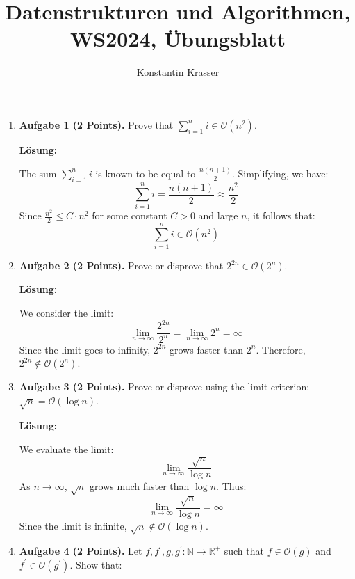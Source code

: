 \documentclass[11pt]{article}
\begin{document}
\author{Konstantin Krasser}
\title{Datenstrukturen und Algorithmen, WS2024, Übungsblatt}
\maketitle

\medskip

\begin{enumerate}

	\item
	      \textbf{Aufgabe 1 (2 Points).} Prove that \(\sum_{i=1}^n i \in \mathcal{O}\left(n^2\right)\).

	      \textbf{Lösung:}

	      The sum \(\sum_{i=1}^n i\) is known to be equal to \(\frac{n(n+1)}{2}\). Simplifying, we have:
	      \[
		      \sum_{i=1}^n i = \frac{n(n+1)}{2} \approx \frac{n^2}{2}
	      \]
	      Since \(\frac{n^2}{2} \leq C \cdot n^2\) for some constant \(C > 0\) and large \(n\), it follows that:
	      \[
		      \sum_{i=1}^n i \in \mathcal{O}(n^2)
	      \]

	\item
	      \textbf{Aufgabe 2 (2 Points).} Prove or disprove that \(2^{2n} \in \mathcal{O}\left(2^n\right)\).

	      \textbf{Lösung:}

	      We consider the limit:
	      \[
		      \lim_{n \to \infty} \frac{2^{2n}}{2^n} = \lim_{n \to \infty} 2^n = \infty
	      \]
	      Since the limit goes to infinity, \(2^{2n}\) grows faster than \(2^n\). Therefore, \(2^{2n} \not\in \mathcal{O}(2^n)\).

	\item
	      \textbf{Aufgabe 3 (2 Points).} Prove or disprove using the limit criterion: \(\sqrt{n} = \mathcal{O}(\log n)\).

	      \textbf{Lösung:}

	      We evaluate the limit:
	      \[
		      \lim_{n \to \infty} \frac{\sqrt{n}}{\log n}
	      \]
	      As \(n \to \infty\), \(\sqrt{n}\) grows much faster than \(\log n\). Thus:
	      \[
		      \lim_{n \to \infty} \frac{\sqrt{n}}{\log n} = \infty
	      \]
	      Since the limit is infinite, \(\sqrt{n} \not\in \mathcal{O}(\log n)\).

	\item
	      \textbf{Aufgabe 4 (2 Points).} Let \(f, f^{\prime}, g, g^{\prime}: \mathbb{N} \rightarrow \mathbb{R}^{+}\) such that \(f \in \mathcal{O}(g)\) and \(f^{\prime} \in \mathcal{O}\left(g^{\prime}\right)\). Show that:


\end{enumerate}
\end{document}
